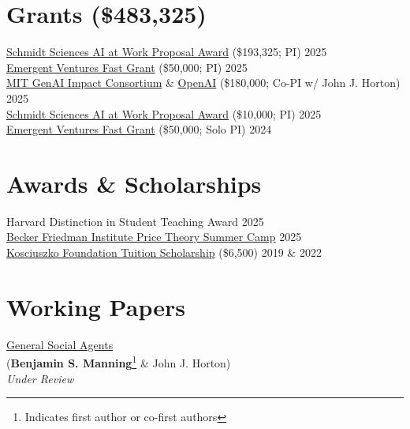 \documentclass[margin,line,pifont,palatino,courier, 9pt]{res}
\begin{document}
\begin{resume}
\section{\sc Grants (\$483,325)}
\href{https://www.schmidtsciences.org/ai-at-work/}{Schmidt Sciences AI at Work Proposal Award} (\$193,325; PI) \hfill 2025 \\
\href{https://www.mercatus.org/emergent-ventures}{Emergent Ventures Fast Grant} (\$50,000; PI) \hfill 2025 \\
\href{https://computing.mit.edu/research/mit-generative-ai-impact-consortium/}{MIT GenAI Impact Consortium} \& \href{https://openai.com/}{OpenAI} (\$180,000; Co-PI w/ John J. Horton) \hfill 2025 \\
\href{https://www.schmidtsciences.org/ai-at-work/}{Schmidt Sciences AI at Work Proposal Award} (\$10,000; PI) \hfill 2025 \\
\href{https://www.mercatus.org/emergent-ventures}{Emergent Ventures Fast Grant} (\$50,000; Solo PI) \hfill 2024 

\section{\sc Awards \& Scholarships}
Harvard Distinction in Student Teaching Award \hfill 2025 \\
\href{https://bfi.uchicago.edu/events/event/2025-price-theory-summer-camp/}{Becker Friedman Institute Price Theory Summer Camp} \hfill 2025 \\
\href{https://thekf.org/scholarship/tuition-scholarships/tuition-scholarships-for-graduate-studies/}{Kosciuszko Foundation Tuition Scholarship} (\$6,500) \hfill 2019 \& 2022 




\section{\sc Working Papers}

\href{https://benjaminmanning.io/files/optimize.pdf}{General Social Agents}\\
(\textbf{Benjamin S. Manning}\footnote{Indicates first author or co-first authors} \& John J. Horton)\\
\textit{Under Review}


\end{resume}
\end{document}
